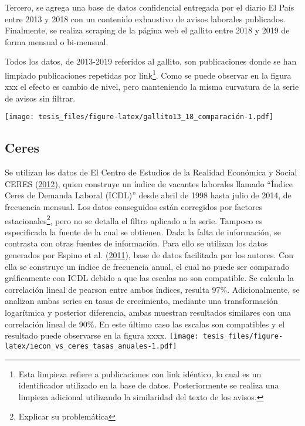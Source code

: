 \documentclass[12pt,twoside]{reedthesis}
\begin{document}
Tercero, se agrega una base de datos confidencial entregada por el diario El País entre 2013 y 2018 con un contenido exhaustivo de avisos laborales publicados. Finalmente, se realiza scraping de la página web el gallito entre 2018 y 2019 de forma mensual o bi-mensual.

Todos los datos, de 2013-2019 referidos al gallito, son publicaciones donde se han limpiado publicaciones repetidas por link\footnote{Esta limpieza refiere a publicaciones con link idéntico, lo cual es un identificador utilizado en la base de datos. Posteriormente se realiza una limpieza adicional utilizando la similaridad del texto de los avisos.}. Como se puede observar en la figura xxx el efecto es cambio de nivel, pero manteniendo la misma curvatura de la serie de avisos sin filtrar.

\texttt{[image: tesis\_files/figure-latex/gallito13\_18\_comparación-1.pdf]}

\hypertarget{ceres}{%
\subsection*{Ceres}\label{ceres}}

Se utilizan los datos de El Centro de Estudios de la Realidad Económica y Social CERES (\protect\hyperlink{ref-Ceres2012}{2012}), quien construye un índice de vacantes laborales llamado ``Índice Ceres de Demanda Laboral (ICDL)'' desde abril de 1998 hasta julio de 2014, de frecuencia mensual. Los datos conseguidos están corregidos por factores estacionales\footnote{Explicar su problemática}, pero no se detalla el filtro aplicado a la serie. Tampoco es especificada la fuente de la cual se obtienen.
Dada la falta de información, se contrasta con otras fuentes de información. Para ello se utilizan los datos generados por Espino et al. (\protect\hyperlink{ref-Alma2011}{2011}), base de datos facilitada por los autores. Con ella se construye un índice de frecuencia anual, el cual no puede ser comparado gráficamente con ICDL debido a que las escalas no son compatible.
Se calcula la correlación lineal de pearson entre ambos índices, resulta 97\%. Adicionalmente, se analizan ambas series en tasas de crecimiento, mediante una transformación logarítmica y posterior diferencia, ambas muestran resultados similares con una correlación lineal de 90\%. En este último caso las escalas son compatibles y el resultado puede observarse en la figura xxxx.
\texttt{[image: tesis\_files/figure-latex/iecon\_vs\_ceres\_tasas\_anuales-1.pdf]}
\end{document}
